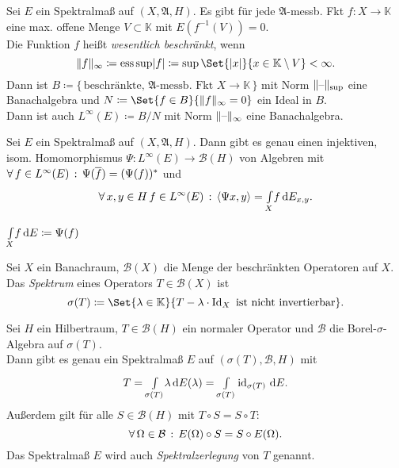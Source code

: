 \documentclass{cheat-sheet}
\newcommand{\K}{\mathbb{K}} %
\newcommand{\Bor}{\mathcal{B}} %
\newcommand{\Alg}{\mathfrak{A}} %
\newcommand{\Boun}{\mathcal{B}} %
\newcommand{\scp}[2]{\langle #1 , #2 \rangle} %
\DeclareMathOperator*{\esssup}{ess\,sup} %
\begin{document}
\begin{defn}
  Sei $E$ ein Spektralmaß auf $(X, \Alg, H)$.
  Es gibt für jede $\Alg$-messb. Fkt $f : X \to \K$ eine max. offene Menge $V \subset \K$ mit $E(f^{-1}(V)) = 0$. \\
  Die Funktion $f$ heißt \emph{wesentlich beschränkt}, wenn
  \[ \norm{f}_\infty \coloneqq \esssup \abs{f} \coloneqq \sup \Set{\abs{x}}{x \in \K \setminus V} < \infty. \]
  Dann ist $B \!\coloneqq\! \{\, \text{beschränkte, $\Alg$-messb. Fkt $X \!\to\! \K$} \,\}$ mit Norm $\lVert\text{--}\rVert_\text{sup}$ eine Banachalgebra und $N \coloneqq \Set{f \in B}{\norm{f}_\infty = 0}$ ein Ideal in $B$. \\
  Dann ist auch $L^\infty(E) \coloneqq B / N$ mit Norm $\lVert\text{--}\rVert_\infty$ eine Banachalgebra.
\end{defn}

\begin{thm}
  Sei $E$ ein Spektralmaß auf $(X, \Alg, H)$. Dann gibt es genau einen injektiven, isom. Homomorphismus $\Psi : L^\infty(E) \to \Boun(H)$ von Algebren mit $\forall \, {f \in L^\infty(E)} \,:\, \Psi(\overline{f}) = (\Psi(f))^*$ und
  \[
    \fa{x, y \in H \, f \in L^\infty(E)} \scp{\Psi x}{y} = \Int{X}{}{f}{E_{x,y}}.
  \]
\end{thm}

\begin{nota}
  ${\textstyle \int\limits_{X}^{}} f \,\mathrm{d} E \coloneqq \Psi(f)$
\end{nota}

\begin{defn}
  Sei $X$ ein Banachraum, $\Boun(X)$ die Menge der beschränkten Operatoren auf $X$.
  Das \emph{Spektrum} eines Operators $T \in \Boun(X)$ ist
  \[ \sigma(T) \coloneqq \Set{\lambda \in \K}{T - \lambda \cdot \Id_X \text{ ist nicht invertierbar}}. \]
\end{defn}

\begin{thm}
  Sei $H$ ein Hilbertraum, $T \in \Boun(H)$ ein normaler Operator und $\Bor$ die Borel-$\sigma$-Algebra auf $\sigma(T)$. \\
  Dann gibt es genau ein Spektralmaß $E$ auf $(\sigma(T), \Bor, H)$ mit
  \[
    T = {\textstyle \int\limits_{\sigma(T)}^{}} \lambda \,\mathrm{d} E(\lambda) = {\textstyle \int\limits_{\sigma(T)}^{}} \operatorname{id}_{\sigma(T)} \,\mathrm{d} E.
  \]
  Außerdem gilt für alle $S \in \Boun(H)$ mit $T \circ S = S \circ T$:
  \[ \fa{\Omega \in \Bor} E(\Omega) \circ S = S \circ E(\Omega). \]
  Das Spektralmaß $E$ wird auch \emph{Spektralzerlegung} von $T$ genannt.
\end{thm}
\end{document}
